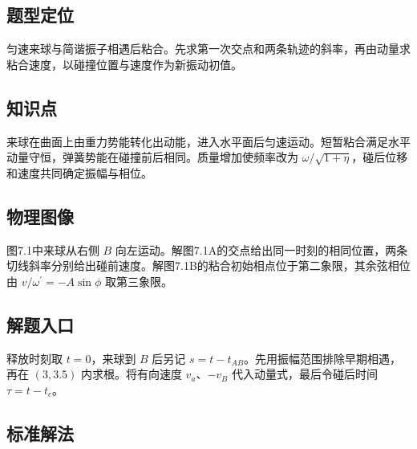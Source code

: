 \documentclass[UTF8,fontset=fandol,a4paper,11pt]{ctexart}
\begin{document}


\subsection*{题型定位}

匀速来球与简谐振子相遇后粘合。先求第一次交点和两条轨迹的斜率，再由动量求粘合速度，以碰撞位置与速度作为新振动初值。



\subsection*{知识点}

来球在曲面上由重力势能转化出动能，进入水平面后匀速运动。短暂粘合满足水平动量守恒，弹簧势能在碰撞前后相同。质量增加使频率改为 $\omega/\sqrt{1+\eta}$，碰后位移和速度共同确定振幅与相位。




\subsection*{物理图像}

图7.1中来球从右侧 $B$ 向左运动。解图7.1A的交点给出同一时刻的相同位置，两条切线斜率分别给出碰前速度。解图7.1B的粘合初始相点位于第二象限，其余弦相位由 $v/\omega^{\prime}=-A\sin\phi$ 取第三象限。




\subsection*{解题入口}

释放时刻取 $t=0$，来球到 $B$ 后另记 $s=t-t_{AB}$。先用振幅范围排除早期相遇，再在 $(3,3.5)$ 内求根。将有向速度 $v_a$、$-v_B$ 代入动量式，最后令碰后时间 $\tau=t-t_c$。



\subsection*{标准解法}
\end{document}
